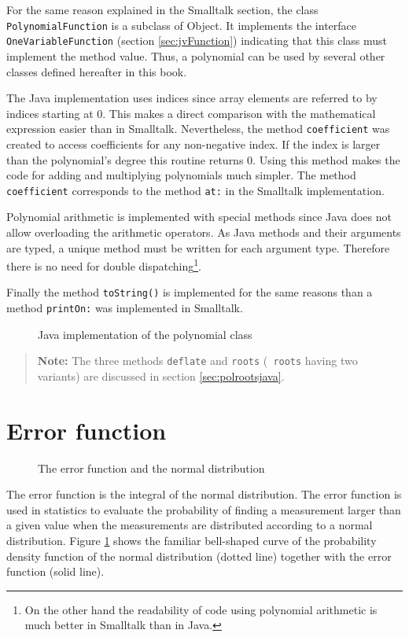\documentclass[twoside]{book}
\begin{document}
For the same reason explained in the Smalltalk section, the class
{\tt PolynomialFunction} is a subclass of Object. It implements
the interface {\tt OneVariableFunction} (\cf section
\ref{sec:jvFunction}) indicating that this class must implement
the method value. Thus, a polynomial can be used by several other
classes defined hereafter in this book.

The Java implementation uses indices since array elements are
referred to by indices starting at 0. This makes a direct
comparison with the mathematical expression easier than in
Smalltalk. Nevertheless, the method {\tt coefficient} was created
to access coefficients for any non-negative index. If the index is
larger than the polynomial's degree this routine returns 0. Using
this method makes the code for adding and multiplying polynomials
much simpler. The method {\tt coefficient} corresponds to the
method {\tt at:} in the Smalltalk implementation.

Polynomial arithmetic is implemented with special methods since
Java does not allow overloading the arithmetic operators. As Java
methods and their arguments are typed, a unique method must be
written for each argument type. Therefore there is no need for
double dispatching\footnote{On the other hand the readability of
code using polynomial arithmetic is much better in Smalltalk than
in Java.}.

Finally the method {\tt toString()} is implemented for the same
reasons than a method {\tt printOn:} was implemented in Smalltalk.

\begin{figure}
\begin{listing}
\caption{Java implementation of the polynomial class}
\label{lj:polynomial}

\end{listing}
\end{figure}
\begin{quote}
{\bf Note:} The three methods {\tt deflate} and {\tt roots} ({\tt
roots} having two variants) are discussed in section
\ref{sec:polrootsjava}.
\end{quote}


\section{Error function}
\label{sec:errorFunction}
\begin{figure}
\center{}
\caption{The error function and the normal
distribution}\label{fig:errorFunction}
\end{figure}
The error function is the integral of the normal distribution. The
error function is used in statistics to evaluate the probability
of finding a measurement larger than a given value when the
measurements are distributed according to a normal distribution.
Figure \ref{sec:errorFunction} shows the familiar bell-shaped
curve of the probability density function of the normal
distribution (dotted line) together with the error function (solid
line).
\end{document}
